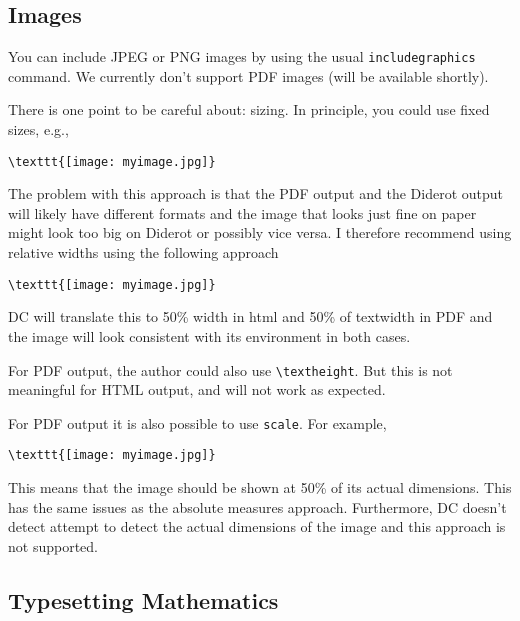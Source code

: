 \subsection{Images}

You can include JPEG or PNG images by using the usual \lstinline`includegraphics` command.  
%
We currently don't support PDF images (will be available shortly).

There is one point to be careful about: sizing.  
%
In principle, you could use fixed sizes, e.g.,
\begin{lstlisting}
\texttt{[image: myimage.jpg]}
\end{lstlisting}
%
The problem with this approach is that the PDF output and the Diderot output will likely have different formats and the image that looks just fine on paper might look too big on Diderot or possibly vice versa.
%
I therefore recommend using relative widths using the following approach
\begin{lstlisting}
\texttt{[image: myimage.jpg]}
\end{lstlisting}
DC will translate this to 50\% width in html and 50\% of textwidth in PDF and the image will look consistent with its environment in both cases.  

\begin{note}
For PDF output, the author could also use \lstinline`\textheight`.
%
But this is not meaningful for HTML output, and will not work as expected.
\end{note}

\begin{important}
For PDF output it is also possible to use \lstinline`scale`.  For example,
\begin{lstlisting}
\texttt{[image: myimage.jpg]}
\end{lstlisting}

This means that the image should be shown at 50\% of its actual dimensions.  This has  the same issues as the absolute measures approach. Furthermore, DC doesn't detect attempt to detect the actual dimensions of the image and this approach is not supported.
\end{important}

\subsection{Typesetting Mathematics}

